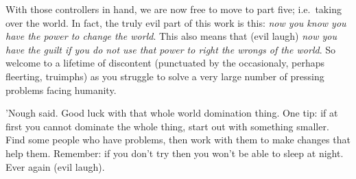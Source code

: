 With those controllers in hand, we are now free to move to part five;
i.e.~taking over the world. In fact, the truly evil part of this work is
this: \emph{now you know you have the power to change the world}. This
also means that (evil laugh) \emph{now you have the guilt if you do not
use that power to right the wrongs of the world}. So welcome to a
lifetime of discontent (punctuated by the occasionaly, perhaps
fleerting, truimphs) as you struggle to solve a very large number of
pressing problems facing humanity.

'Nough said. Good luck with that whole world domination thing. One tip:
if at first you cannot dominate the whole thing, start out with
something smaller. Find some people who have problems, then work with
them to make changes that help them. Remember: if you don't try then you
won't be able to sleep at night. Ever again (evil laugh).
